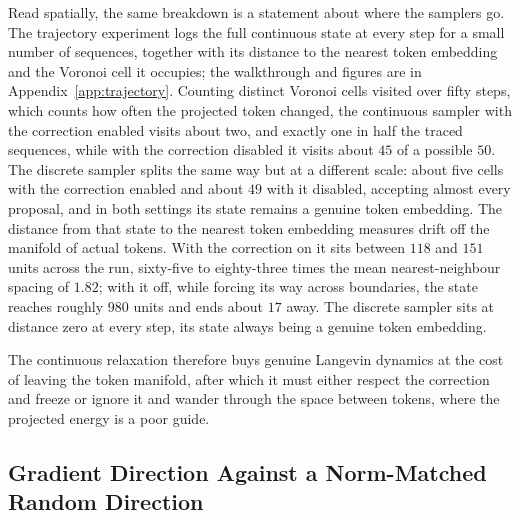 Read spatially, the same breakdown is a statement about where the samplers go. The trajectory experiment logs the full continuous state at every step for a small number of sequences, together with its distance to the nearest token embedding and the Voronoi cell it occupies; the walkthrough and figures are in Appendix~\ref{app:trajectory}. Counting distinct Voronoi cells visited over fifty steps, which counts how often the projected token changed, the continuous sampler with the correction enabled visits about two, and exactly one in half the traced sequences, while with the correction disabled it visits about $45$ of a possible $50$. The discrete sampler splits the same way but at a different scale: about five cells with the correction enabled and about $49$ with it disabled, accepting almost every proposal, and in both settings its state remains a genuine token embedding.
The distance from that state to the nearest token embedding measures drift off the manifold of actual tokens. With the correction on it sits between $118$ and $151$ units across the run, sixty-five to eighty-three times the mean nearest-neighbour spacing of $1.82$; with it off, while forcing its way across boundaries, the state reaches roughly $980$ units and ends about $17$ away. The discrete sampler sits at distance zero at every step, its state always being a genuine token embedding.

The continuous relaxation therefore buys genuine Langevin dynamics at the cost of leaving the token manifold, after which it must either respect the correction and freeze or ignore it and wander through the space between tokens, where the projected energy is a poor guide.

\subsection{Gradient Direction Against a Norm-Matched Random Direction}
\label{sec:results-fallacy}

